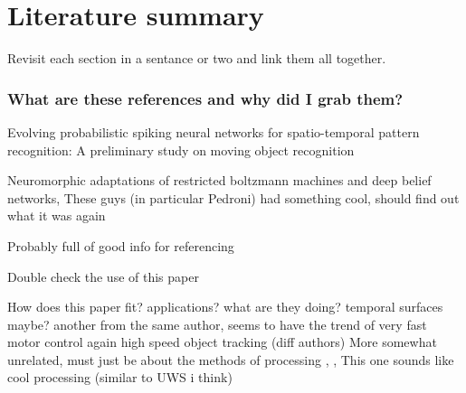 
\section{Literature summary}      %
Revisit each section in a sentance or two and link them all together.

\subsubsection{What are these references and why did I grab them?}
Evolving probabilistic spiking neural networks for spatio-temporal pattern recognition: A preliminary study on moving object recognition \cite{kasabov2011evolving}

Neuromorphic adaptations of restricted boltzmann machines and deep belief networks, These guys (in particular Pedroni) had something cool, should find out what it was again \cite{pedroni2013neuromorphic}

Probably full of good info for referencing \cite{delbruck2014research}

Double check the use of this paper \cite{gil2014active}

How does this paper fit? applications? what are they doing? temporal surfaces maybe? \cite{davide2014high} another from the same author, seems to have the trend of very fast motor control \cite{mueggler2014event} again high speed object tracking (diff authors) \cite{saner2014high} More somewhat unrelated, must just be about the methods of processing \cite{mueggler2015continuous}, \cite{barranco2016dataset}, This one sounds like cool processing (similar to UWS i think) \cite{Bichler}
